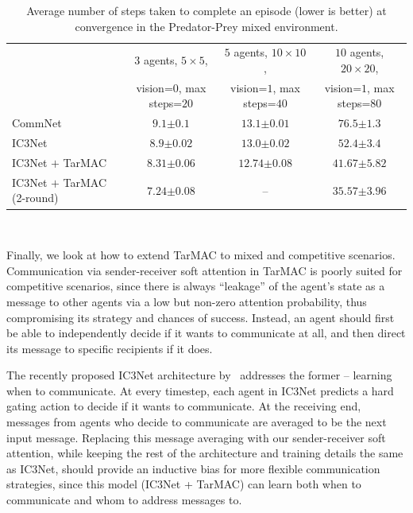 \begin{table}[t]
\centering
\begin{tabular}{lccc}
    & \multicolumn{1}{c}{{\scriptsize $3$ agents, $5 \times 5$,}}
        & \multicolumn{1}{c}{{\scriptsize $5$ agents, $10 \times 10$,}}
        & \multicolumn{1}{c}{{\scriptsize $10$ agents, $20 \times 20$,}} \\[-0.05in]
    & \multicolumn{1}{c}{{\scriptsize vision=$0$, max steps=$20$}}
        & \multicolumn{1}{c}{{\scriptsize vision=$1$, max steps=$40$}}
        & \multicolumn{1}{c}{{\scriptsize vision=$1$, max steps=$80$}}    \\ \midrule
    {CommNet~\cite{sukhbaatar_nips16}}
        & {$9.1$}{\scriptsize $\pm 0.1$} & {$13.1$}{\scriptsize $\pm 0.01$} & {$76.5$}{\scriptsize $\pm 1.3$}  \\ [0.05in]
    {IC3Net~\cite{singh_iclr19}}
        & {$8.9$}{\scriptsize $\pm 0.02$} & {$13.0$}{\scriptsize $\pm 0.02$} & {$52.4$}{\scriptsize $\pm 3.4$} \\ [0.05in]
    {IC3Net $+$ TarMAC}
        & {$8.31$}{\scriptsize $\pm 0.06$} & {$\mathbf{12.74}$}{\scriptsize $\pm 0.08$} & {$41.67$}{\scriptsize $\pm 5.82$} \\ [0.05in]
    {IC3Net $+$ TarMAC (2-round)}
        & {$\mathbf{7.24}$}{\scriptsize $\pm 0.08$} & -- & {$\mathbf{35.57}$}{\scriptsize $\pm 3.96$} \\ \bottomrule
\end{tabular} \\[0.1in]
\caption{Average number of steps taken to complete an episode (lower is better)
        at convergence in the Predator-Prey mixed environment.}
\label{table:ppnumbers}
\vspace{-15pt}
\end{table}

Finally, we look at how to extend TarMAC to
mixed and competitive scenarios. Communication via sender-receiver soft
attention in TarMAC is poorly suited for competitive scenarios,
since there is always ``leakage'' of the agent's state as a message to other
agents via a low but non-zero attention probability, thus compromising its
strategy and chances of success. Instead, an agent should first be able to independently decide if it wants to
communicate at all, and then direct its message to specific recipients if it does.

The recently proposed IC3Net architecture by~\citet{singh_iclr19} addresses
the former -- learning when to communicate. At every timestep, each agent in IC3Net
predicts a hard gating action to decide if it wants to communicate.
At the receiving end, messages from agents who decide to communicate are
averaged to be the next input message.
Replacing this message averaging with our sender-receiver soft attention,
while keeping the rest of the architecture and training details the same as
IC3Net,
should provide an inductive bias for more flexible communication strategies,
since this model (IC3Net + TarMAC) can learn both when to
communicate and whom to address messages to.

